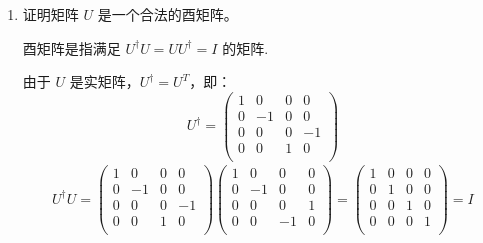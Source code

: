 \documentclass[11pt]{article}
\begin{document}
\begin{enumerate}[label=\alph*.]
    \item 证明矩阵 $U$ 是一个合法的酉矩阵。
    
    酉矩阵是指满足 \( U^\dagger U = U U^\dagger = I \) 的矩阵.

    由于 \( U \) 是实矩阵，\( U^\dagger = U^T \)，即：
    \[
    U^\dagger = \begin{pmatrix}
    1 & 0 & 0 & 0 \\
    0 & -1 & 0 & 0 \\
    0 & 0 & 0 & -1 \\
    0 & 0 & 1 & 0 \\
    \end{pmatrix}
    \]
    \begin{align}
        U^\dagger U = \begin{pmatrix}
            1 & 0 & 0 & 0 \\
            0 & -1 & 0 & 0 \\
            0 & 0 & 0 & -1 \\
            0 & 0 & 1 & 0 \\
            \end{pmatrix}
            \begin{pmatrix}
            1 & 0 & 0 & 0 \\
            0 & -1 & 0 & 0 \\
            0 & 0 & 0 & 1 \\
            0 & 0 & -1 & 0 \\
            \end{pmatrix}
            = \begin{pmatrix}
            1 & 0 & 0 & 0 \\
            0 & 1 & 0 & 0 \\
            0 & 0 & 1 & 0 \\
            0 & 0 & 0 & 1 \\
            \end{pmatrix} 
            = I       
    \end{align}


\end{enumerate}
\end{document}
